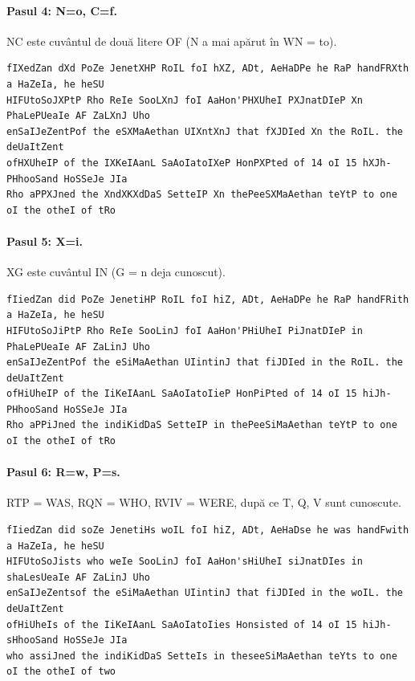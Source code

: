 \paragraph{Pasul 4: N=o, C=f.} NC este cuvântul de două litere OF (N a mai apărut în WN = to).
\begin{lstlisting}[language={}]
fIXedZan dXd PoZe JenetXHP RoIL foI hXZ, ADt, AeHaDPe he RaP handFRXth a HaZeIa, he heSU
HIFUtoSoJXPtP Rho ReIe SooLXnJ foI AaHon'PHXUheI PXJnatDIeP Xn PhaLePUeaIe AF ZaLXnJ Uho
enSaIJeZentPof the eSXMaAethan UIXntXnJ that fXJDIed Xn the RoIL. the deUaItZent
ofHXUheIP of the IXKeIAanL SaAoIatoIXeP HonPXPted of 14 oI 15 hXJh-PHhooSand HoSSeJe JIa
Rho aPPXJned the XndXKXdDaS SetteIP Xn thePeeSXMaAethan teYtP to one oI the otheI of tRo
\end{lstlisting}

\paragraph{Pasul 5: X=i.} XG este cuvântul IN (G = n deja cunoscut).
\begin{lstlisting}[language={}]
fIiedZan did PoZe JenetiHP RoIL foI hiZ, ADt, AeHaDPe he RaP handFRith a HaZeIa, he heSU
HIFUtoSoJiPtP Rho ReIe SooLinJ foI AaHon'PHiUheI PiJnatDIeP in PhaLePUeaIe AF ZaLinJ Uho
enSaIJeZentPof the eSiMaAethan UIintinJ that fiJDIed in the RoIL. the deUaItZent
ofHiUheIP of the IiKeIAanL SaAoIatoIieP HonPiPted of 14 oI 15 hiJh-PHhooSand HoSSeJe JIa
Rho aPPiJned the indiKidDaS SetteIP in thePeeSiMaAethan teYtP to one oI the otheI of tRo
\end{lstlisting}

\paragraph{Pasul 6: R=w, P=s.} RTP = WAS, RQN = WHO, RVIV = WERE, după ce T, Q, V sunt cunoscute.
\begin{lstlisting}[language={}]
fIiedZan did soZe JenetiHs woIL foI hiZ, ADt, AeHaDse he was handFwith a HaZeIa, he heSU
HIFUtoSoJists who weIe SooLinJ foI AaHon'sHiUheI siJnatDIes in shaLesUeaIe AF ZaLinJ Uho
enSaIJeZentsof the eSiMaAethan UIintinJ that fiJDIed in the woIL. the deUaItZent
ofHiUheIs of the IiKeIAanL SaAoIatoIies Honsisted of 14 oI 15 hiJh-sHhooSand HoSSeJe JIa
who assiJned the indiKidDaS SetteIs in theseeSiMaAethan teYts to one oI the otheI of two
\end{lstlisting}

